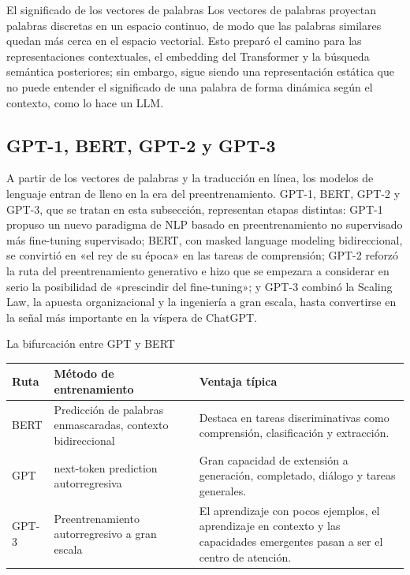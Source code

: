 \begin{importantbox}{El significado de los vectores de palabras}
Los vectores de palabras proyectan palabras discretas en un espacio continuo, de modo que las palabras similares quedan más cerca en el espacio vectorial. Esto preparó el camino para las representaciones contextuales, el embedding del Transformer y la búsqueda semántica posteriores; sin embargo, sigue siendo una representación estática que no puede entender el significado de una palabra de forma dinámica según el contexto, como lo hace un LLM.
\end{importantbox}

\subsection{GPT-1, BERT, GPT-2 y GPT-3}

A partir de los vectores de palabras y la traducción en línea, los modelos de lenguaje entran de lleno en la era del preentrenamiento. GPT-1, BERT, GPT-2 y GPT-3, que se tratan en esta subsección, representan etapas distintas: GPT-1 propuso un nuevo paradigma de NLP basado en preentrenamiento no supervisado más fine-tuning supervisado; BERT, con masked language modeling bidireccional, se convirtió en «el rey de su época» en las tareas de comprensión; GPT-2 reforzó la ruta del preentrenamiento generativo e hizo que se empezara a considerar en serio la posibilidad de «prescindir del fine-tuning»; y GPT-3 combinó la Scaling Law, la apuesta organizacional y la ingeniería a gran escala, hasta convertirse en la señal más importante en la víspera de ChatGPT.

\begin{knowledgebox}{La bifurcación entre GPT y BERT}
\begin{tabularx}{\textwidth}{p{}p{}X}
\toprule
Ruta & Método de entrenamiento & Ventaja típica \\
\midrule
BERT & Predicción de palabras enmascaradas, contexto bidireccional & Destaca en tareas discriminativas como comprensión, clasificación y extracción. \\
GPT & next-token prediction autorregresiva & Gran capacidad de extensión a generación, completado, diálogo y tareas generales. \\
GPT-3 & Preentrenamiento autorregresivo a gran escala & El aprendizaje con pocos ejemplos, el aprendizaje en contexto y las capacidades emergentes pasan a ser el centro de atención. \\
\bottomrule
\end{tabularx}
\end{knowledgebox}


